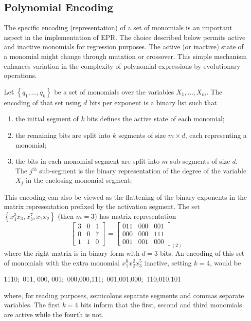 \documentclass[preprint,authoryear,12pt]{elsarticle}
\newcommand{\note}[1]{\textbf{\small [Note\footnote{\textbf{Note:} #1}]}}
\newcommand{\nth}{\ensuremath{^{th}}}
\begin{document}
\subsection{Polynomial Encoding}\label{subs:polynomial.encoding}
%
%
The specific encoding (representation) of a set of monomials is an important aspect in the implementation of \ac{EPR}. The choice described below permits active and inactive monomials for regression purposes. The active (or inactive) state of a monomial might change through mutation or crossover. This simple mechanism enhances variation in the complexity of polynomial expressions by evolutionary operations.

Let  $\left\lbrace q_1, \ldots, q_k\right\rbrace$ be a set of monomials over the variables $X_1, \ldots, X_m$. The encoding of that set using $d$ bits per exponent is a binary list such that
\begin{enumerate}
\item the initial segment of $k$ bits defines the active state of each monomial;
\item the remaining bits are split into $k$ segments of size $m\times d$, each representing a monomial;
\item the bits in each monomial segment are split into $m$ sub-segments of size $d$. The $j\nth$ sub-segment is the binary representation of the degree of the variable $X_j$ in the enclosing monomial segment;
\end{enumerate}
This encoding can also be viewed as the flattening of the binary exponents in the matrix representation prefixed by the activation segment. The set $\left\lbrace x_1^3 x_3, x_3^7, x_1 x_2\right\rbrace$ (then $m = 3$) has matrix representation
$$\left[ 
\begin{array}{ccc}
3 & 0 & 1 \\
0 & 0 & 7 \\
1 & 1 & 0
\end{array}
\right] = \left[ 
\begin{array}{ccc}
011 & 000 & 001 \\
000 & 000 & 111 \\
001 & 001 & 000
\end{array}
\right]_{\left( 2 \right)}
$$
where the right matrix is in binary form with  $d = 3$ bits. An encoding of this set of monomials with the extra monomial $x_1^6x_2^2x_3^5$ inactive, setting $k = 4$, would be
\begin{center}
1110;~011, 000, 001;~000,000,111;~001,001,000;~110,010,101
\end{center}
where, for reading purposes, semicolons separate segments and commas separate variables. The first $k=4$ bits inform that the first, second and third monomials are active while the fourth is not.
\end{document}
